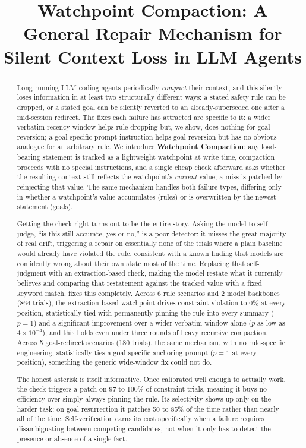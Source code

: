 \documentclass[11pt]{article}
\title{\textbf{Watchpoint Compaction: A General Repair Mechanism for Silent Context Loss in LLM Agents}}
\author{}
\date{}
\begin{document}
\maketitle

\begin{abstract}
Long-running LLM coding agents periodically \emph{compact} their context, and this silently loses information in at least two structurally different ways: a stated safety rule can be dropped, or a stated goal can be silently reverted to an already-superseded one after a mid-session redirect. The fixes each failure has attracted are specific to it: a wider verbatim recency window helps rule-dropping but, we show, does nothing for goal reversion; a goal-specific prompt instruction helps goal reversion but has no obvious analogue for an arbitrary rule. We introduce \textbf{Watchpoint Compaction}: any load-bearing statement is tracked as a lightweight watchpoint at write time, compaction proceeds with no special instructions, and a single cheap check afterward asks whether the resulting context still reflects the watchpoint's \emph{current} value; a miss is patched by reinjecting that value. The same mechanism handles both failure types, differing only in whether a watchpoint's value accumulates (rules) or is overwritten by the newest statement (goals).

Getting the check right turns out to be the entire story. Asking the model to self-judge, ``is this still accurate, yes or no,'' is a poor detector: it misses the great majority of real drift, triggering a repair on essentially none of the trials where a plain baseline would already have violated the rule, consistent with a known finding that models are confidently wrong about their own state most of the time. Replacing that self-judgment with an extraction-based check, making the model restate what it currently believes and comparing that restatement against the tracked value with a fixed keyword match, fixes this completely. Across 6 rule scenarios and 2 model backbones (864 trials), the extraction-based watchpoint drives constraint violation to 0\% at every position, statistically tied with permanently pinning the rule into every summary ($p=1$) and a significant improvement over a wider verbatim window alone ($p$ as low as $4\times10^{-4}$), and this holds even under three rounds of heavy recursive compaction. Across 5 goal-redirect scenarios (180 trials), the same mechanism, with no rule-specific engineering, statistically ties a goal-specific anchoring prompt ($p=1$ at every position), something the generic wide-window fix could not do.

The honest asterisk is itself informative. Once calibrated well enough to actually work, the check triggers a patch on 97 to 100\% of constraint trials, meaning it buys no efficiency over simply always pinning the rule. Its selectivity shows up only on the harder task: on goal resurrection it patches 50 to 85\% of the time rather than nearly all of the time. Self-verification earns its cost specifically when a failure requires disambiguating between competing candidates, not when it only has to detect the presence or absence of a single fact.
\end{abstract}
\end{document}
